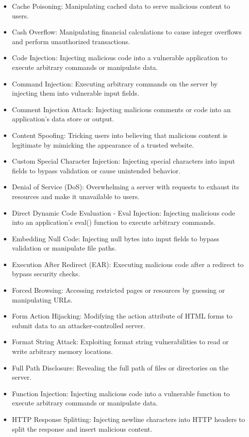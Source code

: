\begin{itemize}
\item Cache Poisoning: Manipulating cached data to serve malicious content to users.
\item Cash Overflow: Manipulating financial calculations to cause integer overflows and perform unauthorized transactions.
\item Code Injection: Injecting malicious code into a vulnerable application to execute arbitrary commands or manipulate data.
\item Command Injection: Executing arbitrary commands on the server by injecting them into vulnerable input fields.
\item Comment Injection Attack: Injecting malicious comments or code into an application's data store or output.
\item Content Spoofing: Tricking users into believing that malicious content is legitimate by mimicking the appearance of a trusted website.
\item Custom Special Character Injection: Injecting special characters into input fields to bypass validation or cause unintended behavior.
\item Denial of Service (DoS): Overwhelming a server with requests to exhaust its resources and make it unavailable to users.
\item Direct Dynamic Code Evaluation - Eval Injection: Injecting malicious code into an application's eval() function to execute arbitrary commands.
\item Embedding Null Code: Injecting null bytes into input fields to bypass validation or manipulate file paths.
\item Execution After Redirect (EAR): Executing malicious code after a redirect to bypass security checks.
\item Forced Browsing: Accessing restricted pages or resources by guessing or manipulating URLs.
\item Form Action Hijacking: Modifying the action attribute of HTML forms to submit data to an attacker-controlled server.
\item Format String Attack: Exploiting format string vulnerabilities to read or write arbitrary memory locations.
\item Full Path Disclosure: Revealing the full path of files or directories on the server.
\item Function Injection: Injecting malicious code into a vulnerable function to execute arbitrary commands or manipulate data.
\item HTTP Response Splitting: Injecting newline characters into HTTP headers to split the response and insert malicious content.

\end{itemize}
